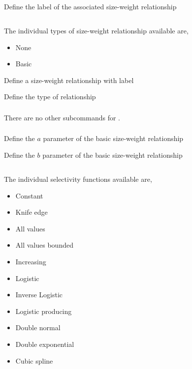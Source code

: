  {Define the label of the associated size-weight relationship}

\subsection{}

The individual types of size-weight relationship available are,

\begin{itemize}
	\item None
	\item Basic
\end{itemize}

 {Define a size-weight relationship with label}

 {Define the type of relationship}

\subsubsection[None]{}

There are no other subcommands for .

\subsubsection[Basic]{}

 {Define the $a$ parameter of the basic size-weight relationship}

 {Define the $b$ parameter of the basic size-weight relationship}

\subsection{}

The individual selectivity functions available are,

\begin{itemize}
	\item Constant
	\item Knife edge
	\item All values
	\item All values bounded
	\item Increasing
	\item Logistic
	\item Inverse Logistic
	\item Logistic producing
	\item Double normal
	\item Double exponential
	\item Cubic spline
\end{itemize}

